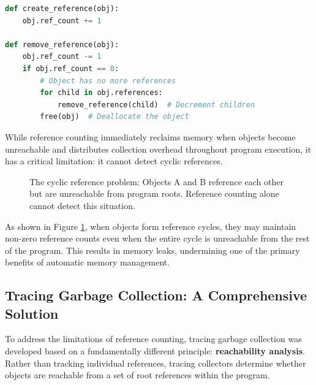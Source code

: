\documentclass{article}
\begin{document}
\begin{lstlisting}[language=Python, caption=Reference Counting Concept, style=pythonstyle]
def create_reference(obj):
    obj.ref_count += 1

def remove_reference(obj):
    obj.ref_count -= 1
    if obj.ref_count == 0:
        # Object has no more references
        for child in obj.references:
            remove_reference(child)  # Decrement children
        free(obj)  # Deallocate the object
\end{lstlisting}

While reference counting immediately reclaims memory when objects become unreachable and distributes collection overhead throughout program execution, it has a critical limitation: it cannot detect cyclic references.

\begin{figure}[h]
\centering
{}
\caption{The cyclic reference problem: Objects A and B reference each other but are unreachable from program roots. Reference counting alone cannot detect this situation.}
\label{fig:cyclic_refs}
\end{figure}

As shown in Figure \ref{fig:cyclic_refs}, when objects form reference cycles, they may maintain non-zero reference counts even when the entire cycle is unreachable from the rest of the program. This results in memory leaks, undermining one of the primary benefits of automatic memory management.

\subsection{Tracing Garbage Collection: A Comprehensive Solution}

To address the limitations of reference counting, tracing garbage collection was developed based on a fundamentally different principle: \textbf{reachability analysis}. Rather than tracking individual references, tracing collectors determine whether objects are reachable from a set of root references within the program.
\end{document}
